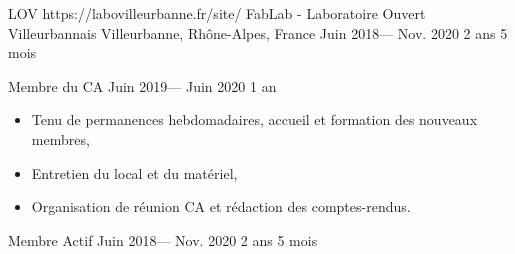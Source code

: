 \volunteerorganization%
{LOV}%
{https://labovilleurbanne.fr/site/}%
{FabLab - Laboratoire Ouvert Villeurbannais}%
{Villeurbanne, Rhône-Alpes, France}%
{Juin 2018--- Nov. 2020}
{2 ans 5 mois}

\volunteerposition%
{Membre du CA}%
{Juin 2019--- Juin 2020}%
{1 an}%
{
	\begin{itemize}
    \item Tenu de permanences hebdomadaires, accueil et formation des nouveaux membres,
    \item Entretien du local et du matériel,
    \item Organisation de réunion CA et rédaction des comptes-rendus.
	\end{itemize}
}

\volunteerposition%
{Membre Actif}%
{Juin 2018--- Nov. 2020}
{2 ans 5 mois}
{}
